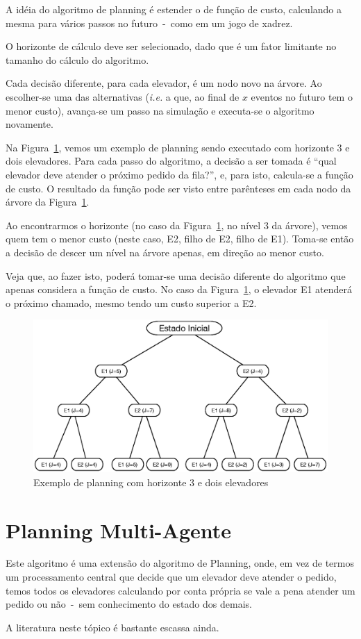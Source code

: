 
A idéia do algoritmo de planning é estender o de função de custo, calculando a
mesma para vários passos no futuro~-~como em um jogo de xadrez.

O horizonte de cálculo deve ser selecionado, dado que é um fator limitante no
tamanho do cálculo do algoritmo.

Cada decisão diferente, para cada elevador, é um nodo novo na árvore. Ao
escolher-se uma das alternativas (\textit{i.e.} a que, ao final de $x$ eventos
no futuro tem o menor custo), avança-se um passo na simulação e executa-se o
algoritmo novamente.

Na Figura~\ref{fig:planning}, vemos um exemplo de planning sendo executado com
horizonte 3 e dois elevadores. Para cada passo do algoritmo, a decisão a ser
tomada é ``qual elevador deve atender o próximo pedido da fila?'', e, para isto,
calcula-se a função de custo. O resultado da função pode ser visto entre
parênteses em cada nodo da árvore da Figura~\ref{fig:planning}.

Ao encontrarmos o horizonte (no caso da Figura~\ref{fig:planning}, no nível 3 da
árvore), vemos quem tem o menor custo (neste caso, E2, filho de E2, filho de
E1). Toma-se então a decisão de descer um nível na árvore apenas, em direção ao
menor custo.

Veja que, ao fazer isto, poderá tomar-se uma decisão diferente do algoritmo que apenas
considera a função de custo. No caso da Figura~\ref{fig:planning}, o elevador E1
atenderá o próximo chamado, mesmo tendo um custo superior a E2.

\begin{figure}[htb!]
  \centering
  \includegraphics[scale=0.8]{img/planning.eps}
  \caption{Exemplo de planning com horizonte 3 e dois elevadores}
\label{fig:planning}
\end{figure}

\section{Planning Multi-Agente}

Este algoritmo é uma extensão do algoritmo de Planning, onde, em vez de termos
um processamento central que decide que um elevador deve atender o pedido, temos
todos os elevadores calculando por conta própria se vale a pena atender um
pedido ou não~-~sem conhecimento do estado dos demais.

A literatura neste tópico é bastante escassa ainda.